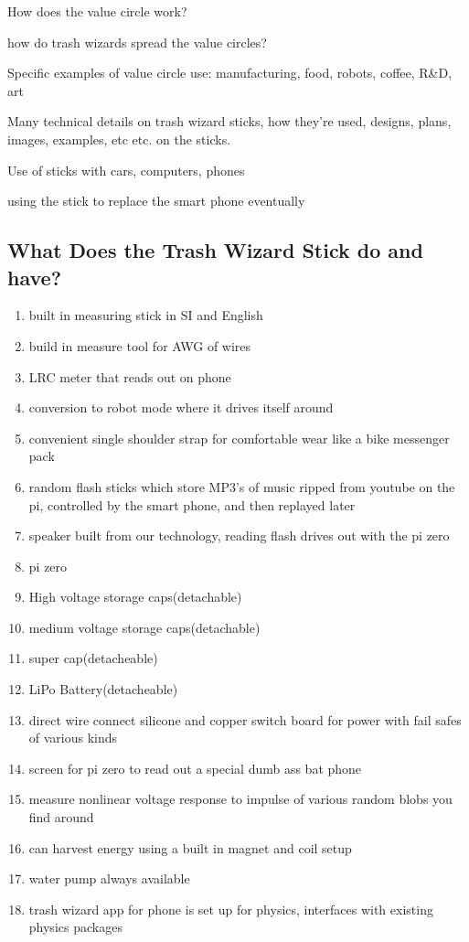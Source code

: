 How does the value circle work?

how do trash wizards spread the value circles?

Specific examples of value circle use: manufacturing, food, robots,
coffee, R\&D, art

Many technical details on trash wizard sticks, how they're used,
designs, plans, images, examples, etc etc. on the sticks.

Use of sticks with cars, computers, phones

using the stick to replace the smart phone eventually

\subsection{What Does the Trash Wizard Stick do and
have?}\label{what-does-the-trash-wizard-stick-do-and-have}

\begin{enumerate}
\def\labelenumi{\arabic{enumi}.}
\tightlist
\item
  built in measuring stick in SI and English
\item
  build in measure tool for AWG of wires
\item
  LRC meter that reads out on phone
\item
  conversion to robot mode where it drives itself around
\item
  convenient single shoulder strap for comfortable wear like a bike
  messenger pack
\item
  random flash sticks which store MP3's of music ripped from youtube on
  the pi, controlled by the smart phone, and then replayed later
\item
  speaker built from our technology, reading flash drives out with the
  pi zero
\item
  pi zero
\item
  High voltage storage caps(detachable)
\item
  medium voltage storage caps(detachable)
\item
  super cap(detacheable)
\item
  LiPo Battery(detacheable)
\item
  direct wire connect silicone and copper switch board for power with
  fail safes of various kinds
\item
  screen for pi zero to read out a special dumb ass bat phone
\item
  measure nonlinear voltage response to impulse of various random blobs
  you find around
\item
  can harvest energy using a built in magnet and coil setup
\item
  water pump always available
\item
  trash wizard app for phone is set up for physics, interfaces with
  existing physics packages
\end{enumerate}

